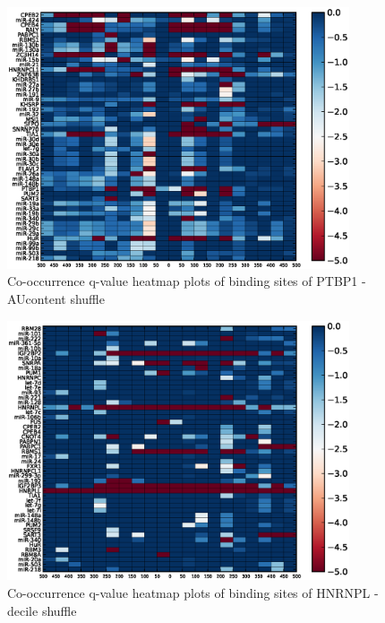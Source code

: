 \begin{figure}
	\includegraphics[width=0.9\textwidth]{appendix1/figures/PTBP1_AUcontent_expressed_heatmap_qvalues0.eps}
	\caption{Co-occurrence q-value heatmap plots of binding sites of PTBP1 - AUcontent shuffle}
\end{figure}
\clearpage
\begin{figure}
   	\includegraphics[width=0.9\textwidth]{appendix1/figures/HNRNPL_normal_expressed_heatmap_qvalues0.eps}
   	\caption{Co-occurrence q-value heatmap plots of binding sites of HNRNPL - decile shuffle}
\end{figure}

